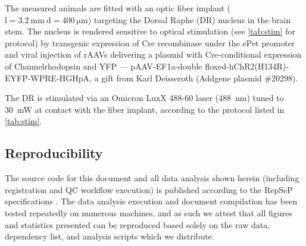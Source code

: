 The measured animals are fitted with an optic fiber implant ($\mathrm{l=\SI{3.2}{\milli\meter} \ d=\SI{400}{\micro\meter}}$) targeting the Dorsal Raphe (DR) nucleus in the brain stem.
The nucleus is rendered sensitive to optical stimulation (see \cref{tab:stim} for protocol) by transgenic expression of Cre recombinase under the ePet promoter \cite{Scott2005} and viral injection of rAAVs delivering a plasmid with Cre-conditional expression of Channelrhodopsin and YFP ---
pAAV-EF1a-double floxed-hChR2(H134R)-EYFP-WPRE-HGHpA, a gift from Karl Deisseroth (Addgene plasmid \#20298).

The DR is stimulated via an Omicron LuxX 488-60 laser (\SI{488}{\nano\meter}) tuned to \SI{30}{\milli\watt} at contact with the fiber implant, according to the protocol listed in \cref{tab:stim}.

\subsection{Reproducibility}

The source code for this document and all data analysis shown herein (including registration and QC workflow execution) is published according to the RepSeP specifications \cite{repsep}.
The data analysis execution and document compilation has been tested repeatedly on numerous machines, and as such we attest that all figures and statistics presented can be reproduced based solely on the raw data, dependency list, and analysis scripts which we distribute.
